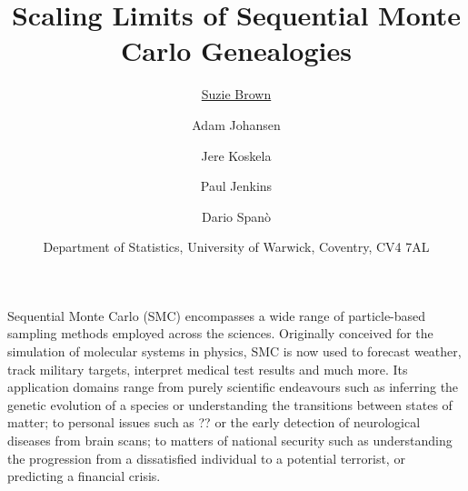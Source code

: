 \documentclass[a4paper]{article}
\title{\textbf{Scaling Limits of Sequential Monte Carlo Genealogies}}
\author{\underline{Suzie Brown}\and Adam Johansen\and Jere Koskela\and Paul Jenkins\and Dario Span\`o}
\date{\small{Department of Statistics, University of Warwick, Coventry, CV4 7AL}}
\begin{document}
\maketitle

Sequential Monte Carlo (SMC) encompasses a wide range of particle-based sampling methods employed across the sciences. Originally conceived for the simulation of molecular systems in physics, SMC is now used to forecast weather, track military targets, interpret medical test results and much more.
Its application domains range from purely scientific endeavours such as inferring the genetic evolution of a species or understanding the transitions between states of matter; to personal issues such as ?? or the early detection of neurological diseases from brain scans; to matters of national security such as understanding the progression from a dissatisfied individual to a potential terrorist, or predicting a financial crisis.

\thispagestyle{empty}
\end{document}
